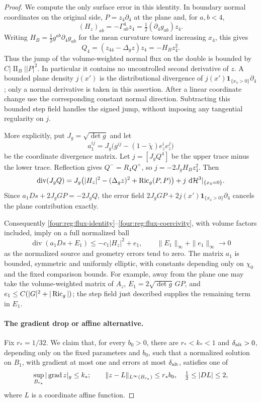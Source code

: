 \begin{proof}
We compute the only surface error in this identity.  In boundary
normal coordinates on the original side, $P=z_4\partial_4$ at the
plane and, for $a,b<4$,
\[
 (H_z)_{ab}=-\Gamma^4_{ab}z_4
             =\tfrac12(\partial_4g_{ab})z_4.
\]
Writing $H_B=\tfrac12g^{ab}\partial_4g_{ab}$ for the mean curvature
toward increasing $x_4$, this gives
\[
 Q_4=(z_{44}-\Delta_gz)z_4=-H_Bz_4^2.
\]
Thus the jump of the volume-weighted normal flux on the double is
bounded by $C|\operatorname{II}_B||P|^2$.  In particular it contains
no uncontrolled second derivative of $z$.  A bounded plane density
$j(x')$ is the distributional divergence of
$j(x')\mathbf1_{\{x_4>0\}}\partial_4$; only a normal derivative is
taken in this assertion.  After a linear coordinate change use the
corresponding constant normal direction.  Subtracting this bounded
step field handles the signed jump, without imposing any tangential
regularity on $j$.

More explicitly, put $J_g=\sqrt{\det g}$ and let
\[
 a_1^{ij}=J_g\bigl(g^{ij}-(1-\widetilde\chi)e_z^ie_z^j\bigr)
\]
be the coordinate divergence matrix. Let $j=[J_gQ^4]$ be the upper trace minus the lower trace.  Reflection
gives $Q^-=R_4Q^+$, so $j=-2J_gH_Bz_4^2$.  Then
\[
 \operatorname{div}(J_gQ)
 =J_g\bigl(|H_z|^2-(\Delta_gz)^2+\operatorname{Ric}_g(P,P)\bigr)
                   +j\,\,\mathrm d\mathcal H^3|_{\{x_4=0\}}.
\]
Since $a_1Ds+2J_gGP=-2J_gQ$, the error field
$2J_gGP+2j(x')\mathbf1_{\{x_4>0\}}\partial_4$ cancels the
plane contribution exactly.

Consequently \eqref{four:reg:flux-identity}--\eqref{four:reg:flux-coercivity},
with volume factors included, imply on a full normalized ball
\begin{equation}\label{four:reg:deficit-inequality}
 \operatorname{div}(a_1Ds+E_1)
       \le-c_1|H_z|^2+e_1,
 \qquad
 \|E_1\|_\infty+\|e_1\|_\infty\longrightarrow0
\end{equation}
as the normalized source and geometry errors tend to zero.  The
matrix $a_1$ is bounded, symmetric and uniformly elliptic, with
constants depending only on $\chi_0$ and the fixed comparison bounds.
For example, away from the plane one may take the volume-weighted
matrix of $A_z$, $E_1=2\sqrt{\det g}\,GP$, and
$e_1\le C(|G|^2+|\operatorname{Ric}_g|)$; the step field just described supplies
the remaining term in $E_1$.

\paragraph{The gradient drop or affine alternative.}
Fix $r_*=1/32$.  We claim that, for every $b_0>0$, there are
$r_*<k_*<1$ and $\delta_{\rm alt}>0$, depending only on the fixed
parameters and $b_0$, such that a normalized solution on $B_1$,
with gradient at most one and errors at most $\delta_{\rm alt}$,
satisfies one of
\begin{equation}\label{four:reg:alternative}
 \sup_{B_{r_*}}|\operatorname{grad} z|_g\le k_*;\qquad
 \|z-L\|_{L^\infty(B_{r_*})}\le r_*b_0,
       \quad \tfrac12\le|DL|\le2,
\end{equation}
where $L$ is a coordinate affine function.


\end{proof}
